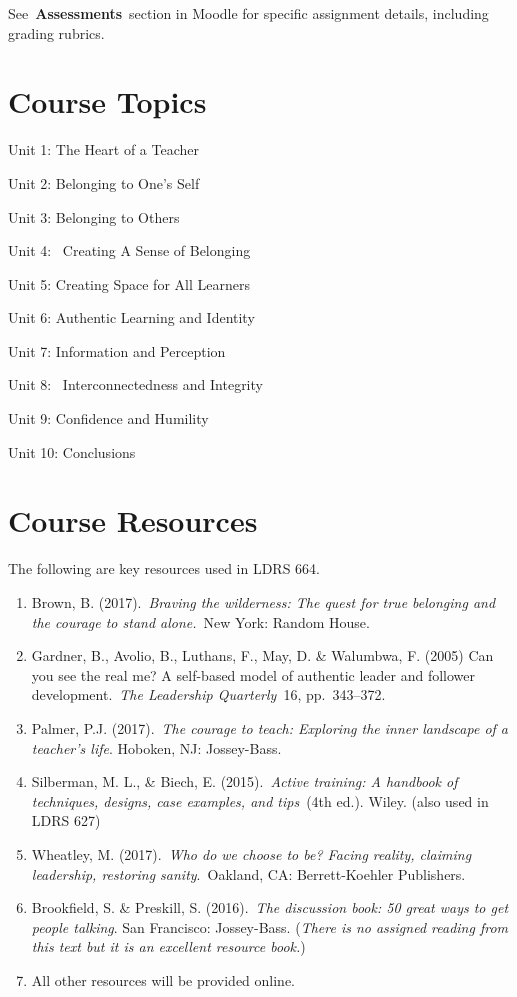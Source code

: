 \documentclass[
]{book}
\begin{document}
See~\textbf{Assessments}~section in Moodle for specific assignment details, including
grading rubrics.

\hypertarget{course-topics}{%
\section*{Course Topics}\label{course-topics}}

Unit 1: The Heart of a Teacher

Unit 2: Belonging to One's Self

Unit 3: Belonging to Others

Unit 4: ~Creating A Sense of Belonging

Unit 5: Creating Space for All Learners

Unit 6: Authentic Learning and Identity

Unit 7: Information and Perception

Unit 8: ~Interconnectedness and Integrity

Unit 9: Confidence and Humility

Unit 10: Conclusions

\hypertarget{course-resources}{%
\section*{Course Resources}\label{course-resources}}

The following are key resources used in LDRS 664.

\begin{enumerate}
\def\labelenumi{\arabic{enumi}.}
\item
  Brown, B. (2017).~\emph{Braving the wilderness: The quest for true belonging and the courage to stand alone.}~New York: Random House.
\item
  Gardner, B., Avolio, B., Luthans, F., May, D. \& Walumbwa, F. (2005) Can you see the real me? A self-based model of authentic leader and follower development.~\emph{The Leadership Quarterly}~16, pp.~343--372.
\item
  Palmer, P.J. (2017).~\emph{The courage to teach: Exploring the inner landscape of a teacher's life}. Hoboken, NJ: Jossey-Bass.
\item
  Silberman, M. L., \& Biech, E. (2015).~\emph{Active training: A handbook of techniques, designs, case examples, and tips}~(4th ed.). Wiley. (also used in LDRS 627)
\item
  Wheatley, M. (2017).~\emph{Who do we choose to be? Facing reality, claiming leadership, restoring sanity}.~Oakland, CA: Berrett-Koehler Publishers.
\item
  Brookfield, S. \& Preskill, S. (2016).~\emph{The discussion book: 50 great ways to get people talking}. San Francisco: Jossey-Bass. (\emph{There is no assigned reading from this text but it is an excellent resource book.})
\item
  All other resources will be provided online.
\end{enumerate}
\end{document}
